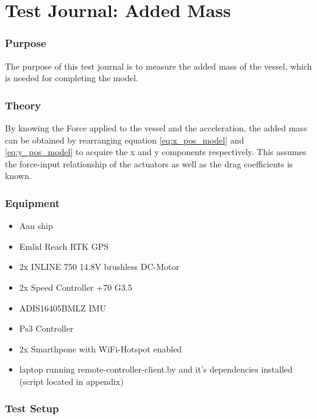 \chapter{Test Journal: Added Mass}
\subsection{Purpose}
The purpose of this test journal is to measure the added mass of the vessel, which is needed for completing the model.
\subsection{Theory}
By knowing the Force applied to the vessel and the acceleration, the added mass can be obtained by rearranging equation \autoref{eq:x_pos_model} and \autoref{eq:y_pos_model} to acquire the x and y components respectively.
This assumes the force-input relationship of the actuators as well as the drag coefficients is known.

\subsection{Equipment}
\begin{itemize}
	\item Aau ship
	\item Emlid Reach RTK GPS
	\item 2x INLINE 750 14.8V brushless DC-Motor
	\item 2x Speed Controller +70 G3.5
	\item ADIS16405BMLZ IMU
	\item Ps3 Controller  
	\item 2x Smarthpone with WiFi-Hotspot enabled
	\item laptop running remote-controller-client.by and it's dependencies installed (script located in appendix)
\end{itemize}


\subsection{Test Setup}



